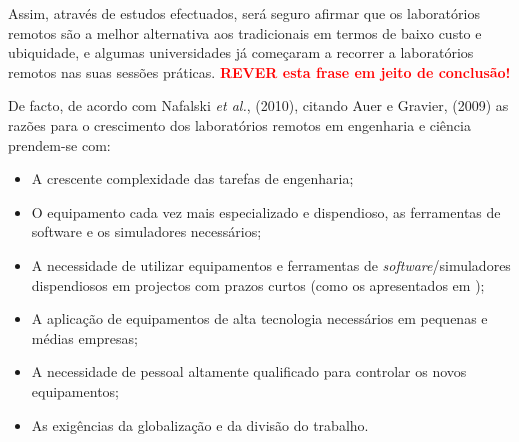 Assim, através de estudos efectuados, será seguro afirmar que os laboratórios remotos são a melhor alternativa aos tradicionais em termos de baixo custo e ubiquidade, e algumas universidades já começaram a recorrer a laboratórios remotos nas suas sessões práticas\cite{VISIREngineeringPractices}. \textbf{\textcolor{red}{REVER esta frase em jeito de conclusão!}}

De facto, de acordo com Nafalski \textit{et al.}, (2010)\cite{ExperiencesRemoteLaboratories}, citando Auer e Gravier, (2009)\cite{ThemMnyfacesRemotLab} as razões para o crescimento dos laboratórios remotos em engenharia e ciência prendem-se com:

\begin{itemize}
    \item A crescente complexidade das tarefas de engenharia;
    \item O equipamento cada vez mais especializado e dispendioso, as ferramentas de software e os simuladores necessários;
    \item A necessidade de utilizar equipamentos e ferramentas de \textit{software}/simuladores dispendiosos em projectos com prazos curtos (como os apresentados em \cite{ExperiencesRemoteLab});
    \item A aplicação de equipamentos de alta tecnologia necessários em pequenas e médias empresas;
    \item A necessidade de pessoal altamente qualificado para controlar os novos equipamentos;
    \item As exigências da globalização e da divisão do trabalho.
\end{itemize}

